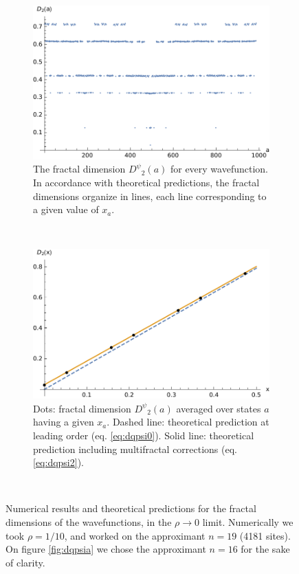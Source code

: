 \documentclass[aps,prl,preprint]{revtex4-1}
\newcommand{\wf}{\ensuremath{D^\psi}}
\begin{document}
\begin{figure}[htp]

\centering
\begin{subfigure}{.5\textwidth}
  \centering
  \includegraphics[width=1.\textwidth]{img/local_dim_wf.pdf}
  \caption{The fractal dimension $\wf_2(a)$ for every wavefunction. In accordance with theoretical predictions, the fractal dimensions organize in lines, each line corresponding to a given value of $x_a$.}
  \label{fig:dqpsia}
\end{subfigure}%
~
\begin{subfigure}{.5\textwidth}
  \centering
  \includegraphics[width=1.\textwidth]{img/local_wf.pdf}
  \caption{Dots: fractal dimension $\wf_2(a)$ averaged over states $a$ having a given $x_a$. Dashed line: theoretical prediction at leading order (eq. \eqref{eq:dqpsi0}). Solid line: theoretical prediction including multifractal corrections (eq. \eqref{eq:dqpsi2}).}
  \label{fig:dqpsix}
\end{subfigure} \\

\caption{Numerical results and theoretical predictions for the fractal dimensions of the wavefunctions, in the $\rho \rightarrow 0$ limit. Numerically we took $\rho = 1/10$, and worked on the approximant $n=19$ (4181 sites). On figure \eqref{fig:dqpsia} we chose the approximant $n = 16$ for the sake of clarity.}
\label{fig:dqpsi}
\end{figure}
\end{document}
